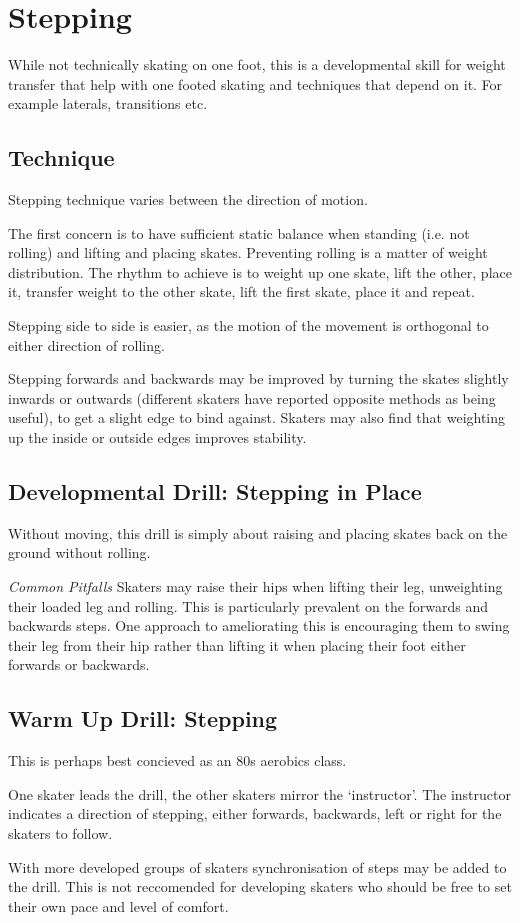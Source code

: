 \section{Stepping}
While not technically skating on one foot, this is a developmental skill for weight transfer that help with one footed skating and techniques that depend on it. For example laterals, transitions etc.   


\subsection*{Technique}

Stepping technique varies between the direction of motion. 

The first concern is to have sufficient static balance when standing (i.e. not rolling) and lifting and placing skates.  
Preventing rolling is a matter of weight distribution.
The rhythm to achieve is to weight up one skate, lift the other, place it, transfer weight to the other skate, lift the first skate, place it and repeat. 


Stepping side to side is easier, as the motion of the movement is orthogonal to either direction of rolling. 

Stepping forwards and backwards may be improved by turning the skates slightly inwards or outwards (different skaters have reported opposite methods as being useful), to get a slight edge to bind against.   
Skaters may also find that weighting up the inside or outside edges improves stability.



\subsection*{Developmental Drill: Stepping in Place} 
\label{drill:one_foot/stepping/in_place}
Without moving, this drill is simply about raising and placing skates back on the ground without rolling.


{\it Common Pitfalls}
Skaters may raise their hips when lifting their leg, unweighting their loaded leg and rolling. This is particularly prevalent on the forwards and backwards steps. 
One approach to ameliorating this is encouraging them to swing their leg from their hip rather than lifting it when placing their foot either forwards or backwards. 


\subsection*{Warm Up Drill: Stepping} 
\label{drill:one_foot/stepping/warm_up}

This is perhaps best concieved as an 80s aerobics class.

One skater leads the drill, the other skaters mirror the `instructor'.
The instructor indicates a direction of stepping, either forwards, backwards, left or right for the skaters to follow.


With more developed groups of skaters synchronisation of steps may be added to the drill. This is not reccomended for developing skaters who should be free to set their own pace and level of comfort.

